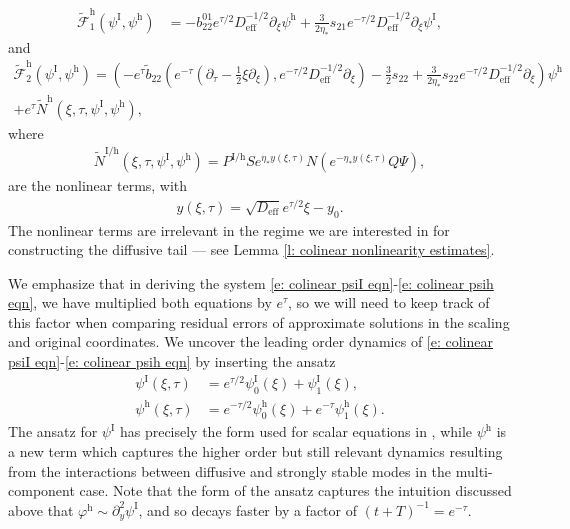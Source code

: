 \documentclass[11pt]{article}
\renewcommand{\phi}{\varphi}
\numberwithin{equation}{section}
\numberwithin{prop}{section}
\newcommand{\phih}{\phi^\mathrm{h}}
\newcommand{\psih}{\psi^\mathrm{h}}
\newcommand{\Deff}{D_\mathrm{eff}}
\newcommand{\tfh}{\tilde{\mathcal{F}}^\mathrm{h}}
\newcommand{\psiI}{\psi^\mathrm{I}}
\begin{document}
\begin{align}
\tfh_1 (\psiI, \psih) &= - b_{22}^{01} e^{\tau/2} \Deff^{-1/2} \partial_\xi \psih + \frac{3}{2 \eta_*} s_{21} e^{-\tau/2} \Deff^{-1/2} \partial_\xi \psiI, \label{e: colinear tfh 1 def}
\end{align}
and
\begin{multline}
\tfh_2 (\psiI, \psih) = \left( - e^\tau \tilde{b}_{22} \left( e^{-\tau} (\partial_\tau - \frac{1}{2} \xi \partial_\xi), e^{-\tau/2} \Deff^{-1/2} \partial_\xi\right) - \frac{3}{2} s_{22} + \frac{3}{2 \eta_*} s_{22} e^{-\tau/2} \Deff^{-1/2} \partial_\xi\right) \psih \\
+ e^\tau \tilde{N}^\mathrm{h} (\xi, \tau, \psiI, \psih),
\end{multline}
where
\begin{align}
\tilde{N}^\mathrm{I/h} (\xi, \tau, \psiI, \psih) = P^\mathrm{I/h} S e^{\eta_* y(\xi, \tau)} N(e^{-\eta_* y(\xi,\tau)} Q \Psi),
\end{align}
are the nonlinear terms, with 
\begin{align}
y(\xi, \tau) = \sqrt{\Deff} e^{\tau/2} \xi - y_0. 
\end{align}
The nonlinear terms are irrelevant in the regime we are interested in for constructing the diffusive tail --- see Lemma \ref{l: colinear nonlinearity estimates}. 

We emphasize that in deriving the system \eqref{e: colinear psiI eqn}-\eqref{e: colinear psih eqn}, we have multiplied both equations by $e^\tau$, so we will need to keep track of this factor when comparing residual errors of approximate solutions in the scaling and original coordinates. We uncover the leading order dynamics of \eqref{e: colinear psiI eqn}-\eqref{e: colinear psih eqn} by inserting the ansatz
\begin{align}
\psiI(\xi, \tau) &= e^{\tau/2} \psiI_0 (\xi) + \psiI_1 (\xi), \label{e: colinear ansatz 1} \\
\psih(\xi, \tau) &= e^{-\tau/2} \psih_0 (\xi) + e^{-\tau}\psih_1 (\xi). \label{e: colinear ansatz 2}
\end{align}
The ansatz for $\psiI$ has precisely the form used for scalar equations in \cite{CAMS, NRRrefined}, while $\psih$ is a new term which captures the higher order but still relevant dynamics resulting from the interactions between diffusive and strongly stable modes in the multi-component case. Note that the form of the ansatz captures the intuition discussed above that $\phih \sim \partial_y^2 \psiI$, and so decays faster by a factor of $(t+T)^{-1} = e^{-\tau}$. 
\end{document}

